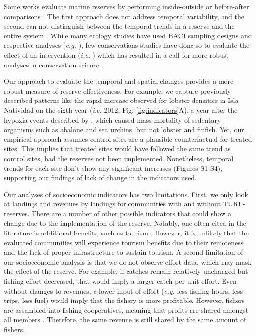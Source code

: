 \documentclass{frontiersSCNS}
\begin{document}
Some works evaluate marine reserves by performing inside-outside
\citep{guidetti_2014-8Z,friedlander_2017-oI,rodriguez_2017-PD} or
before-after comparisons \citep{betti_2017-lq}. The first approach does
not address temporal variability, and the second can not distinguish
between the temporal trends in a reserve and the entire system
\citep{depalma_2018}. While many ecology studies have used BACI sampling
designs and respective analyses (\emph{e.g.} \citep{stewartoaten_1986}),
few conservations studies have done so to evaluate the effect of an
intervention (\emph{i.e.}
\citet{francinifilho_2008,lester_2009,moland_2013}) which has resulted
in a call for more robust analyses in conservation science
\citep{guidetti_2002,ferraro_2006}.

Our approach to evaluate the temporal and spatial changes provides a
more robust measure of reserve effectiveness. For example, we capture
previously described patterns like the rapid increase observed for
lobster densities in Isla Natividad on the sixth year (\emph{i.e.} 2012;
Fig. \ref{fig:indicators}A), a year after the hypoxia events described
by \citet{micheli_2012-EU}, which caused mass mortality of sedentary
organisms such as abalone and sea urchins, but not lobster and finfish.
Yet, our empirical approach assumes control sites are a plausible
counterfactual for treated sites. This implies that treated sites would
have followed the same trend as control sites, had the reserves not been
implemented. Nonetheless, temporal trends for each site don't show any
significant increases (Figures S1-S4), supporting our findings of lack
of change in the indicators used.

Our analyses of socioeconomic indicators has two limitations. First, we
only look at landings and revenues by landings for communities with and
without TURF-reserves. There are a number of other possible indicators
that could show a change due to the implementation of the reserve.
Notably, one often cited in the literature is additional benefits, such
as tourism \citep{viana_2017}. However, it is unlikely that the
evaluated communities will experience tourism benefits due to their
remoteness and the lack of proper infrastructure to sustain tourism. A
second limitation of our socioeconomic analysis is that we do not
observe effort data, which may mask the effect of the reserve. For
example, if catches remain relatively unchanged but fishing effort
decreased, that would imply a larger catch per unit effort. Even without
changes to revenues, a lower input of effort (\emph{e.g.} less fishing
hours, less trips, less fuel) would imply that the fishery is more
profitable. However, fishers are assambled into fishing cooperatives,
meaning that profits are shared amongst all members
\citep{mccay_2014,mccay_2017}. Therefore, the same revenue is still
shared by the same amount of fishers.
\end{document}
